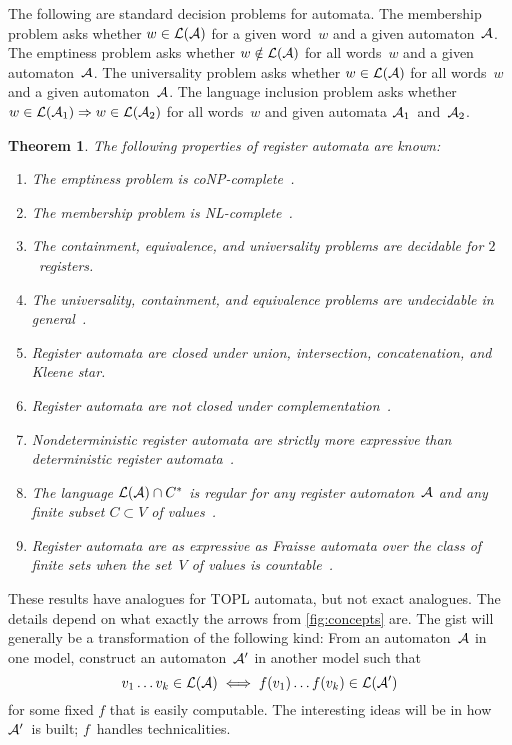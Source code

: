 \documentclass[9pt, preprint]{sigplanconf} %
\newcommand{\limp}{\Rightarrow}
\newtheorem{theorem}{Theorem}
\theoremstyle{definition}
\theoremstyle{remark}
\begin{document}
The following are standard decision problems for automata.
The membership problem asks whether $w\in{\cal L}({\cal A})$ for a given word~$w$ and a given automaton~${\cal A}$.
The emptiness problem asks whether $w\notin{\cal L}({\cal A})$ for all words~$w$ and a given automaton~${\cal A}$.
The universality problem asks whether $w\in{\cal L}({\cal A})$ for all words~$w$ and a given automaton~${\cal A}$.
The language inclusion problem asks whether $w\in{\cal L}({\cal A}_1)\limp w\in{\cal L}({\cal A}_2)$ for all words~$w$ and given automata ${\cal A}_1$~and~${\cal A}_2$.

\begin{theorem}\label{th:ra}
The following properties of register automata are known:
\begin{enumerate}
\item The emptiness problem is coNP-complete~\cite{dblp:journals/tcs/sakamotoi00}.
\item The membership problem is NL-complete~\cite{dblp:conf/mfcs/nevensv01}.
\item The containment, equivalence, and universality problems are decidable for $2$~registers.~\cite{dblp:conf/focs/kaminskif90}
\item The universality, containment, and equivalence problems are undecidable in general~\cite{dblp:conf/mfcs/nevensv01}.
\item Register automata are closed under union, intersection, concatenation, and Kleene star.~\cite{dblp:conf/focs/kaminskif90}
\item Register automata are \emph{not} closed under complementation~\cite{dblp:conf/focs/kaminskif90}.
\item Nondeterministic register automata are strictly more expressive than deterministic register automata~\cite{dblp:conf/focs/kaminskif90}.
\item The language ${\cal L}({\cal A})\cap C^*$ is regular for any register automaton~${\cal A}$ and any finite subset $C\subset V$ of values~\cite{dblp:conf/focs/kaminskif90}.
\item Register automata are as expressive as Fraisse automata over the class of finite sets when the set~$V$ of values is countable~\cite{dblp:conf/lics/bojanczykkl11}.
\end{enumerate}
\end{theorem}

These results have analogues for TOPL automata, but not exact analogues.
The details depend on what exactly the arrows from \autoref{fig:concepts} are.
The gist will generally be a transformation of the following kind:
From an automaton~${\cal A}$ in one model, construct an automaton~${\cal A}'$ in another model such that
\[ v_1\ldots v_k \in {\cal L}({\cal A})
  \iff
f(v_1)\ldots f(v_k)\in{\cal L}({\cal A}') \]
for some fixed $f$ that is easily computable.
The interesting ideas will be in how ${\cal A}'$~is built;
$f$~handles technicalities.
\end{document}
